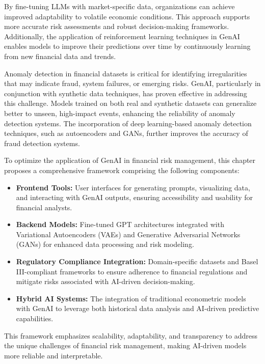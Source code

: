 \documentclass[a4paper,headinclude=on,footinclude=on,12pt,oneside]{scrbook}
\begin{document}
	By fine-tuning LLMs with market-specific data, organizations can achieve improved adaptability to volatile economic conditions. This approach supports more accurate risk assessments and robust decision-making frameworks. Additionally, the application of reinforcement learning techniques in GenAI enables models to improve their predictions over time by continuously learning from new financial data and trends.
	
	
	Anomaly detection in financial datasets is critical for identifying irregularities that may indicate fraud, system failures, or emerging risks. GenAI, particularly in conjunction with synthetic data techniques, has proven effective in addressing this challenge. Models trained on both real and synthetic datasets can generalize better to unseen, high-impact events, enhancing the reliability of anomaly detection systems. The incorporation of deep learning-based anomaly detection techniques, such as autoencoders and GANs, further improves the accuracy of fraud detection systems.
	
	
	To optimize the application of GenAI in financial risk management, this chapter proposes a comprehensive framework comprising the following components:
	
	\begin{itemize}
		\item \textbf{Frontend Tools:} User interfaces for generating prompts, visualizing data, and interacting with GenAI outputs, ensuring accessibility and usability for financial analysts.
		\item \textbf{Backend Models:} Fine-tuned GPT architectures integrated with Variational Autoencoders (VAEs) and Generative Adversarial Networks (GANs) for enhanced data processing and risk modeling.
		\item \textbf{Regulatory Compliance Integration:} Domain-specific datasets and Basel III-compliant frameworks to ensure adherence to financial regulations and mitigate risks associated with AI-driven decision-making.
		\item \textbf{Hybrid AI Systems:} The integration of traditional econometric models with GenAI to leverage both historical data analysis and AI-driven predictive capabilities.
	\end{itemize}
	
	This framework emphasizes scalability, adaptability, and transparency to address the unique challenges of financial risk management, making AI-driven models more reliable and interpretable.
	
\end{document}
